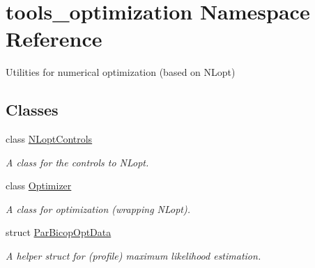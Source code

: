 \hypertarget{namespacetools__optimization}{}\section{tools\+\_\+optimization Namespace Reference}
\label{namespacetools__optimization}


Utilities for numerical optimization (based on N\+Lopt)  


\subsection*{Classes}
\begin{DoxyCompactItemize}
\item 
class \hyperlink{classtools__optimization_1_1_n_lopt_controls}{N\+Lopt\+Controls}
\begin{DoxyCompactList}\small\item\em A class for the controls to N\+Lopt. \end{DoxyCompactList}\item 
class \hyperlink{classtools__optimization_1_1_optimizer}{Optimizer}
\begin{DoxyCompactList}\small\item\em A class for optimization (wrapping N\+Lopt). \end{DoxyCompactList}\item 
struct \hyperlink{structtools__optimization_1_1_par_bicop_opt_data}{Par\+Bicop\+Opt\+Data}
\begin{DoxyCompactList}\small\item\em A helper struct for (profile) maximum likelihood estimation. \end{DoxyCompactList}\end{DoxyCompactItemize}
